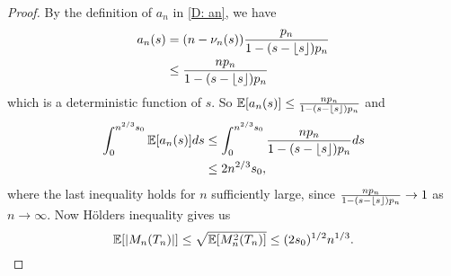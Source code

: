 \begin{proof}
	By the definition of $a_n$ in \eqref{D: an}, we have
	\begin{equation}
	\begin{aligned}
	a_n(s) &= (n - \nu_n(s)) \frac{p_n}{1 - (s - \lfloor s\rfloor)p_n} \\
	&\leq \frac{n p_n}{1 - (s - \lfloor s\rfloor)p_n}
	\end{aligned}
	\end{equation}
	which is a deterministic function of $s$. So
	$ \mathbb{E}[a_n(s)] \leq \frac{n p_n}{1 - (s - \lfloor s\rfloor)p_n} $
	and
	\begin{equation}
	\begin{aligned}
	\int_{0}^{n^{2 / 3}s_0} \mathbb{E}[a_n(s)] ds 
	&\leq \int_{0}^{n^{2 / 3}s_0}\frac{n p_n}{1 - (s - \lfloor s\rfloor)p_n}ds \\
	&\leq 2n^{2 / 3}s_0,
	\end{aligned}
	\end{equation}
	where the last inequality holds for $n$ sufficiently large, since 
	$\frac{n p_n}{1 - (s - \lfloor s\rfloor)p_n} \rightarrow 1$
	as $n \rightarrow \infty$.
	Now Hölders inequality gives us
	\begin{equation} \label{E: Exp(Mn)}
	\mathbb{E}[|M_n(T_n)|] \leq \sqrt{\mathbb{E}[M^2_n(T_n)]} \leq (2s_0)^{1/2}n^{1 / 3}.
	\end{equation}
	

\end{proof}
